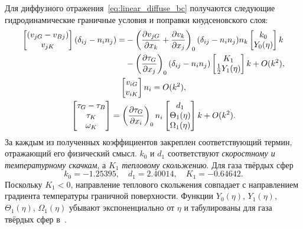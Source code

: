 Для диффузного отражения~\eqref{eq:linear_diffuse_bc} получаются
следующие гидродинамические граничные условия и поправки кнудсеновского слоя:
\begin{gather}
    \begin{aligned}
    \begin{bmatrix} (v_{jG} - v_{Bj}) \\ v_{jK} \end{bmatrix} \deltann{i}{j} =
        &- \onwall{\pder[v_{jG}]{x_k} + \pder[v_k]{x_j}} \deltann{i}{j}n_k
            \begin{bmatrix} k_0 \\ Y_0(\eta) \end{bmatrix}k \\
        &- \onwall{\pder[\tau_G]{x_j}} \deltann{i}{j}
            \begin{bmatrix} K_1 \\ \frac12 Y_1(\eta) \end{bmatrix}k + \OO{k^2},
    \end{aligned} \label{eq:gh:boundary_vt}\\
    \begin{bmatrix} v_{iG} \\ v_{iK} \end{bmatrix} n_i = \OO{k^2}, \label{eq:gh:boundary_vn}\\
    \begin{bmatrix} \tau_G - \tau_B \\ \tau_K \\ \omega_K \end{bmatrix}
        = \onwall{\pder[\tau_G]{x_i}} n_i
            \begin{bmatrix} d_1 \\ \Theta_1(\eta) \\ \Omega_1(\eta) \end{bmatrix}k
        + \OO{k^2}. \label{eq:gh:boundary_tau}
\end{gather}
За каждым из полученных коэффициентов закреплен соответствующий термин, отражающий его физический смысл.
\(k_0\) и \(d_1\) соответствуют \emph{скоростному и температурному скачкам}, а \(K_1\) \emph{тепловому скольжению}.
Для газа твёрдых сфер~\cite{Ohwada1989creep, Ohwada1989jump, Takata2015}
\begin{equation}\label{eq:slip_coeffs_first}
    k_0 = -1.25395, \quad d_1 = 2.40014, \quad K_1 = -0.64642.
\end{equation}
Поскольку \(K_1<0\), направление теплового скольжения совпадает
с направлением градиента температуры граничной поверхности.
Функции \(Y_0(\eta)\), \(Y_1(\eta)\), \(\Theta_1(\eta)\), \(\Omega_1(\eta)\) убывают экспоненциально от \(\eta\)
и табулированы для газа твёрдых сфер в~\cite{Ohwada1989creep, Ohwada1989jump, Sone2002, Sone2007, Takata2015}.

